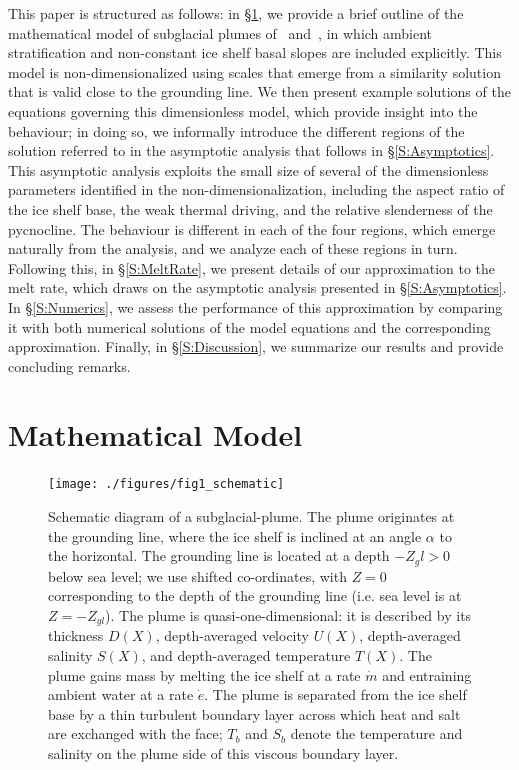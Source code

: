 \documentclass[openacc]{rsproca_new}%
\begin{document}
This paper is structured as follows: in \S\ref{S:Model}, we provide a brief outline of the mathematical model of subglacial plumes of~\cite{Jenkins1991JGeophysResOceans} and~\cite{Jenkins2011JPhysOcean}, in which ambient stratification and non-constant ice shelf basal slopes are included explicitly. This model is non-dimensionalized using scales that emerge from a similarity solution that is valid close to the grounding line. We then present example solutions of the equations governing this dimensionless model, which provide insight into the behaviour; in doing so, we informally introduce the different regions of the solution referred to in the asymptotic analysis that follows in \S\ref{S:Asymptotics}. This asymptotic analysis exploits the small size of several of the dimensionless parameters identified in the non-dimensionalization, including the aspect ratio of the ice shelf base, the weak thermal driving, and the relative slenderness of the pycnocline. The behaviour is different in each of the four regions, which emerge naturally from the analysis, and we analyze each of these regions in turn. Following this, in \S\ref{S:MeltRate}, we present details of our approximation to the melt rate, which draws on the asymptotic analysis presented in \S\ref{S:Asymptotics}. In \S\ref{S:Numerics}, we assess the performance of this approximation by comparing it with both numerical solutions of the model equations and the corresponding~\cite{Lazeroms2019JPhysOcean} approximation. Finally, in \S\ref{S:Discussion}, we summarize our results and provide concluding remarks. 


\section{Mathematical Model}\label{S:Model}

\begin{figure}
\centering
\texttt{[image: ./figures/fig1\_schematic]}
\caption{Schematic diagram of a subglacial-plume. The plume originates at the grounding line, where the ice shelf is inclined at an angle $\alpha$ to the horizontal. The grounding line is located at a depth $-Z_gl >0$ below sea level; we use shifted co-ordinates, with $Z = 0$ corresponding to the depth of the grounding line (i.e. sea level is at $Z = -Z_{gl}$). The plume is quasi-one-dimensional: it is described by its thickness $D(X)$, depth-averaged velocity $U(X)$, depth-averaged salinity $S(X)$, and depth-averaged temperature $T(X)$.  The plume gains mass by melting the ice shelf at a rate $\dot{m}$ and entraining ambient water at a rate $\dot{e}$. The plume is separated from the ice shelf base by a thin turbulent boundary layer across which heat and salt are exchanged with the face; $T_b$ and $S_b$ denote the temperature and salinity on the plume side of this viscous boundary layer. }\label{fig:Schematic}
\end{figure}
\end{document}
